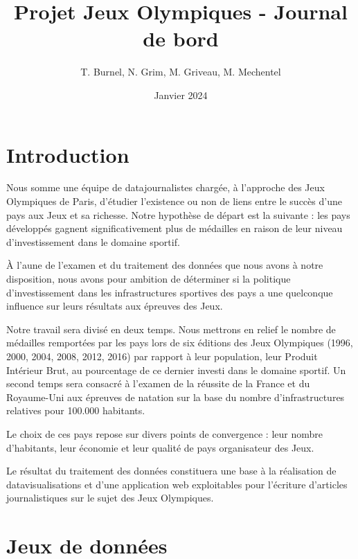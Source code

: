 \documentclass[hidelinks, 12pt]{article}
\title{Projet Jeux Olympiques - Journal de bord}
\date{Janvier 2024}
\author{T. Burnel, N. Grim, M. Griveau, M. Mechentel}
\begin{document}
\maketitle





%





\section{Introduction}

Nous somme une équipe de datajournalistes chargée, à l'approche des Jeux Olympiques de Paris, d'étudier l'existence ou non de liens entre le succès d'une pays aux Jeux et sa richesse. Notre hypothèse de départ est la suivante : les pays développés gagnent significativement plus de médailles en raison de leur niveau d'investissement dans le domaine sportif. 

À l'aune de l'examen et du traitement des données que nous avons à notre disposition, nous avons pour ambition de déterminer si la politique d'investissement dans les infrastructures sportives des pays a une quelconque influence sur leurs résultats aux épreuves des Jeux.

Notre travail sera divisé en deux temps. Nous mettrons en relief le nombre de médailles remportées par les pays lors de six éditions des Jeux Olympiques (1996, 2000, 2004, 2008, 2012, 2016) par rapport à leur population, leur Produit Intérieur Brut, au pourcentage de ce dernier investi dans le domaine sportif. Un second temps sera consacré à l'examen de la réussite de la France et du Royaume-Uni aux épreuves de natation sur la base du nombre d'infrastructures relatives pour 100.000 habitants.

Le choix de ces pays repose sur divers points de convergence : leur nombre d'habitants, leur économie et leur qualité de pays organisateur des Jeux. 

Le résultat du traitement des données constituera une base à la réalisation de datavisualisations et d'une application web exploitables pour l'écriture d'articles journalistiques sur le sujet des Jeux Olympiques.





%





\section{Jeux de données}
\end{document}
